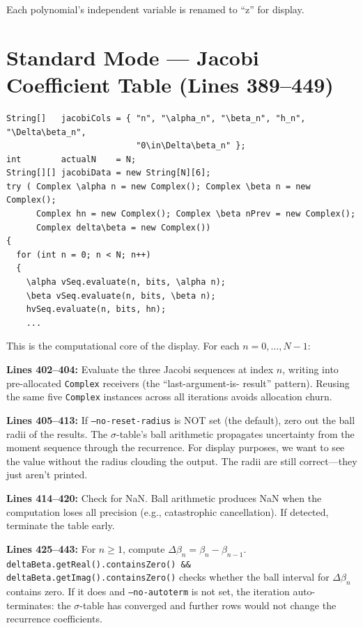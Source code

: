\documentclass[a4paper,11pt]{article}
\begin{document}
Each polynomial's independent variable is renamed to ``z'' for display.

\section{Standard Mode --- Jacobi Coefficient Table (Lines 389--449)}

\begin{lstlisting}[firstnumber=394]
String[]   jacobiCols = { "n", "\alpha_n", "\beta_n", "h_n", "\Delta\beta_n",
                          "0\in\Delta\beta_n" };
int        actualN    = N;
String[][] jacobiData = new String[N][6];
try ( Complex \alpha n = new Complex(); Complex \beta n = new Complex();
      Complex hn = new Complex(); Complex \beta nPrev = new Complex();
      Complex delta\beta = new Complex())
{
  for (int n = 0; n < N; n++)
  {
    \alpha vSeq.evaluate(n, bits, \alpha n);
    \beta vSeq.evaluate(n, bits, \beta n);
    hvSeq.evaluate(n, bits, hn);
    ...
\end{lstlisting}

This is the computational core of the display. For each $n = 0, \ldots, N-1$:

\textbf{Lines 402--404:} Evaluate the three Jacobi sequences at index $n$,
writing into pre-allocated \texttt{Complex} receivers (the ``last-argument-is-
result'' pattern). Reusing the same five \texttt{Complex} instances across all
iterations avoids allocation churn.

\textbf{Lines 405--413:} If \texttt{--no-reset-radius} is NOT set (the default),
zero out the ball radii of the results. The $\sigma$-table's ball arithmetic
propagates uncertainty from the moment sequence through the recurrence. For
display purposes, we want to see the value without the radius clouding the
output. The radii are still correct---they just aren't printed.

\textbf{Lines 414--420:} Check for NaN. Ball arithmetic produces NaN when
the computation loses all precision (e.g., catastrophic cancellation). If
detected, terminate the table early.

\textbf{Lines 425--443:} For $n \ge 1$, compute $\Delta\beta_n = \beta_n - \beta_{n-1}$.
\texttt{deltaBeta.getReal().containsZero() \&\& deltaBeta.getImag().containsZero()}
checks whether the ball interval for $\Delta\beta_n$ contains zero. If it does
and \texttt{--no-autoterm} is not set, the iteration auto-terminates: the
$\sigma$-table has converged and further rows would not change the recurrence
coefficients.
\end{document}

